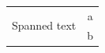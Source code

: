 \documentclass{article}
\begin{document}
\begin{tabular}{|p{2cm}|c|}
\multirow{2}{*}{Spanned text}&a\\
&b\\
\end{tabular}
\end{document}
